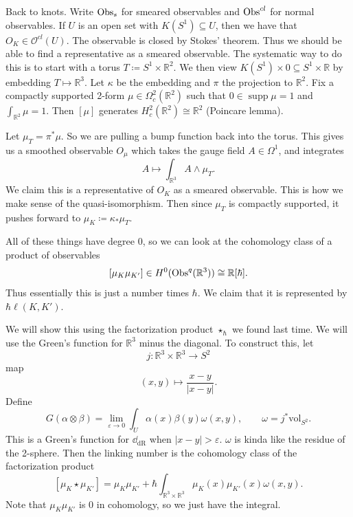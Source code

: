 Back to knots. Write $\operatorname{Obs}_s$ for smeared observables and $\operatorname{Obs}^{cl} $ for normal observables. If $U$ is an open set with $K(S^1)\subseteq U$, then we have that $O_K \in \mathcal{O} ^{cl}(U)$. The observable is closed by Stokes' theorem. Thus we should be able to find a representative as a smeared observable. The systematic way to do this is to start with a torus $T\coloneqq  S^1\times \mathbb{R}^2$. We then view $K(S^1) \times 0 \subseteq S^1 \times \mathbb{R}$ by embedding $T\mapsto \mathbb{R} ^3$. Let $\kappa $ be the embedding and $\pi $ the projection to $\mathbb{R} ^2$. Fix a compactly supported 2-form $\mu \in \Omega _c^2(\mathbb{R} ^2)$ such that $0\in \operatorname{supp} \mu =1$ and $\int_{\mathbb{R} ^2} \mu =1$. Then $[\mu ]$ generates $H^2_c(\mathbb{R} ^2) \cong \mathbb{R} ^2$ (Poincare lemma).

Let $\mu _T = \pi ^*\mu $. So we are pulling a bump function back into the torus. This gives us a smoothed observable $O_\mu $ which takes the gauge field $A\in \Omega ^1$, and integrates
\[
	A\mapsto \int_{\mathbb{R} ^3} A\wedge \mu _T
.\]
We claim this is a representative of $O_K$ as a smeared observable. This is how we make sense of the quasi-isomorphism. Then since $\mu _T$ is compactly supported, it pushes forward to $\mu_{K} \coloneqq \kappa _*\mu _T$.

All of these things have degree 0, so we can look at the cohomology class of a product of observables
\[
	[\mu _K \mu _{K'} ]\in H^0(\operatorname{Obs}^q(\mathbb{R} ^3))\cong \mathbb{R} [\hbar ]
.\]
Thus essentially this is just a number times $\hbar $. We claim that it is represented by $\hbar \ell (K,K')$.

We will show this using the factorization product $\star _\hbar $ we found last time. We will use the Green's function for $\mathbb{R} ^3$ minus the diagonal. To construct this, let
\[
	j : \mathbb{R} ^3\times \mathbb{R} ^3 \to S^2
\]
map
\[
	(x,y)\mapsto \frac{x-y}{\left| x-y \right| } 
.\]
Define
\[
	G(\alpha \otimes \beta ) = \lim_{\varepsilon \to 0} \int_{U} \alpha (x)\beta (y)\omega (x,y),\qquad \omega =j^*\mathrm{vol}_{S^2} 
.\]
This is a Green's function for $\dd _{\mathrm{dR} }$ when $\left| x-y \right| >\varepsilon $. $\omega $ is kinda like the residue of the 2-sphere. Then the linking number is the cohomology class of the factorization product
\[
	[\mu _K \star \mu _{K'}] =\mu _K\mu _{K'} + \hbar \int_{\mathbb{R} ^3\times \mathbb{R} ^3} \mu _K(x)\mu _{K'} (x)\omega (x,y)
.\]
Note that $\mu _K\mu _{K'} $ is 0 in cohomology, so we just have the integral.




